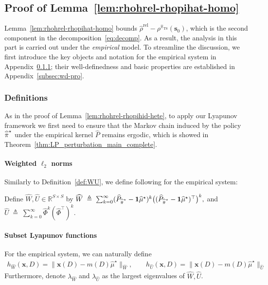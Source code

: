 \documentclass[mnsc,nonblindrev]{informs3}
\newcommand{\lwhat}{\lambda_{\widehat{W}}}
\newcommand{\luhat}{\lambda_{\widehat{U}}}
\newcommand{\Phat}{\widehat{P}}
\newcommand{\one}{\mathbf{1}}
\newcommand{\pihbst}{\widehat{\Bar{\pi}}^\star}
\newcommand{\pihts}{\widehat{\pi}_{\mathrm{TS}}}
\newcommand{\bms}{\bm{s}}
\newcommand{\bmx}{\bm{x}}
\newcommand{\phihat}{\widehat{\Phi}}
\newcommand{\rhohrel}{\widehat{\rho}^{\mathrm{rel}}}
\newcommand{\uhat}{\widehat{U}}
\newcommand{\muhst}{\widehat{\mu}^\star}
\begin{document}
\begin{APPENDICES}
\subsection{Proof of Lemma~\ref{lem:rhohrel-rhopihat-homo}}\label{subsec:pr-C2-homo}

Lemma~\ref{lem:rhohrel-rhopihat-homo} bounds $\rhohrel-\rho^{\pihts}(\bms_0)$, which is the second component in the decomposition~\eqref{eq:decomp}. As a result, the analysis in this part is carried out under the \emph{empirical} model. 
To streamline the discussion, we first introduce the key objects and notation for the empirical system in Appendix~\ref{sssec:defs-hat-homo}; their well-definedness and basic properties are established in Appendix~\ref{subsec:wd-pro}.


\subsubsection{Definitions}\label{sssec:defs-hat-homo}

As in the proof of Lemma~\ref{lem:rhohrel-rhopihid-hete}, to apply our Lyapunov framework we first need to ensure that the Markov chain induced by the policy $\pihbst$ under the empirical kernel $\Phat$ remains ergodic, which is showed in Theorem~\ref{thm:LP_perturbation_main_complete}. 

\paragraph{Weighted $\ell_2$ norms}
Similarly to Definition~\ref{def:WU}, we define following for the empirical system:
\begin{definition} 
\label{def:WhatUhat}
Define $\widehat W,\widehat U\in\mathbb{R}^{S\times S}$ by
$
    \widehat W \;\triangleq\; \sum_{k=0}^{\infty} (\widehat P_{\pihbst}-\one\muhst)^k\bigl((\widehat P_{\pihbst}-\one\muhst)^{\top}\bigr)^k,
$
and
$
    \widehat U \;\triangleq\; \sum_{k=0}^{\infty} \widehat \Phi^k(\phihat^{\top})^k.
$

\paragraph{Subset Lyapunov functions}
For the empirical system, we can naturally define 
\begin{equation}\label{def:huh-hwh}
    \begin{aligned}
        h_{\widehat W}(\bmx,D) =\|\bmx(D)-m(D)\muhst\|_{\widehat{W}},
        \qquad
        h_{\uhat}(\bmx,D) =\|\bmx(D)-m(D)\muhst\|_{\uhat}
    \end{aligned}
\end{equation}
Furthermore, denote $\lwhat$ and $\luhat$ as the largest eigenvalues of $\widehat W, \uhat$.
\end{definition}


\end{APPENDICES}
\end{document}
